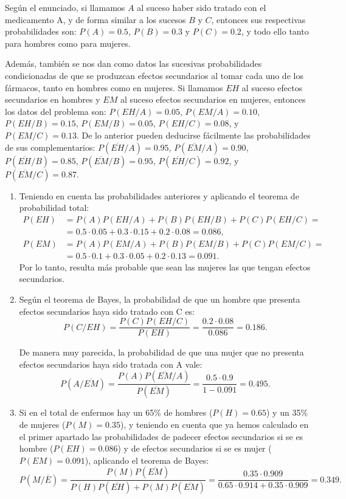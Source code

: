 {Según el enunciado, si llamamos $A$ al suceso haber sido tratado con el medicamento A, y de forma similar a los sucesos $B$ y $C$, entonces sus respectivas probabilidades son: $P(A)=0.5$, $P(B)=0.3$ y $P(C)=0.2$, y todo ello tanto para hombres como para mujeres.

Además, también se nos dan como datos las sucesivas probabilidades condicionadas de que se produzcan efectos secundarios al tomar cada uno de los fármacos, tanto en hombres como en mujeres. Si llamamos $EH$ al suceso efectos secundarios en hombres y $EM$ al suceso efectos secundarios en mujeres, entonces los datos del problema son: $P(EH/A)=0.05$, $P(EM/A)=0.10$, $P(EH/B)=0.15$, $P(EM/B)=0.05$, $P(EH/C)=0.08$, y $P(EM/C)=0.13$. De lo anterior pueden deducirse fácilmente las probabilidades de sus complementarios: $P(\overline{EH}/A)=0.95$, $P(\overline{EM}/A)=0.90$, $P(\overline{EH}/B)=0.85$, $P(\overline{EM}/B)=0.95$, $P(\overline{EH}/C)=0.92$, y $P(\overline{EM}/C)=0.87$.
\begin{enumerate}
\item Teniendo en cuenta las probabilidades anteriores y aplicando el teorema de probabilidad total:
\begin{align*}
P(EH) &=P(A)P(EH/A)+P(B)P(EH/B)+P(C)P(EH/C)=\\
&=0.5\cdot0.05+0.3\cdot0.15+0.2\cdot0.08=0.086,\\
P(EM) &=P(A)P(EM/A)+P(B)P(EM/B)+P(C)P(EM/C)=\\
&=0.5\cdot0.1+0.3\cdot0.05+0.2\cdot0.13=0.091.
\end{align*}
Por lo tanto, resulta más probable que sean las mujeres las que tengan efectos secundarios.

\item Según el teorema de Bayes, la probabilidad de que un hombre que presenta efectos secundarios haya sido tratado con C es:
\[
P(C/EH) = \frac{{P(C)P(EH/C)}}{{P(EH)}} = \frac{{0.2 \cdot 0.08}}{{0.086}} = 0.186.
\]

De manera muy parecida, la probabilidad de que una mujer que no presenta efectos secundarios haya sido tratada con A vale:
\[
P(A/\overline {EM} ) = \frac{{P(A)P(\overline {EM} /A)}}{{P(\overline {EM} )}} = \frac{{0.5 \cdot 0.9}}{{1 - 0.091}} = 0.495.
\]

\item Si en el total de enfermos hay un 65\% de hombres ($P(H)=0.65$) y un 35\% de mujeres ($P(M)=0.35$), y teniendo en cuenta que ya hemos calculado en el primer apartado las probabilidades de padecer efectos secundarios si se es hombre ($P(EH)=0.086$) y de efectos secundarios si se es mujer ($P(EM)=0.091$), aplicando el teorema de Bayes:
\[
P(M/\overline E ) = \frac{{P(M)P(\overline {EM} )}}{{P(H)P(\overline {EH} ) + P(M)P(\overline {EM} )}} = \frac{{0.35 \cdot 0.909}}{{0.65 \cdot 0.914 + 0.35 \cdot 0.909}} = 0.349.
\]
\end{enumerate}
}


